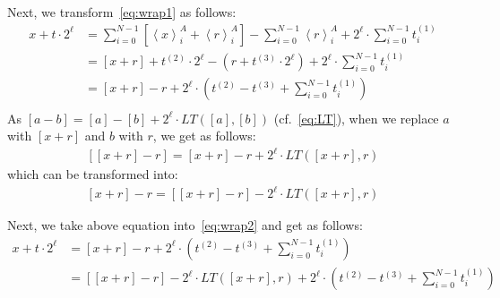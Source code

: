 Next, we transform~\autoref{eq:wrap1} as follows:
\begin{equation}
    \label{eq:wrap2}
    \begin{split}
        x + t\cdot 2^{\ell}  &= \sum_{i = 0}^{N-1}   \left[\left\langle x\right\rangle_i^A+ \left\langle r\right\rangle^A_i \right]  -\sum_{i = 0}^{N-1}\left\langle r\right\rangle^A_i+ 2^{\ell}\cdot \sum_{i = 0}^{N-1}t^{(1)}_i\\
        &= \left[x+r\right]     + t^{(2)}\cdot 2^{\ell}  -\left(r+   t^{(3)}  \cdot 2^{\ell} \right) + 2^{\ell}\cdot \sum_{i = 0}^{N-1}t^{(1)}_i\\
        &= \left[x+r\right]    -r +2^{\ell}\cdot \left(t^{(2)}  -  t^{(3)} +\sum_{i=0}^{N-1} t^{(1)}_i\right) \\
    \end{split}
\end{equation}
As $ \left[ a -b\right]   =\left[a\right]  -\left[ b\right]  +2^{\ell} \cdot LT\left(\left[a\right] ,\left[b\right] \right)$ (cf.~\autoref{eq:LT}), when we replace $a$ with $ \left[x+r  \right] $ and $b$ with $r$, we get as follows:
\begin{equation}
    \begin{split}
        \left[ \left[x+r\right]    -r  \right]  = \left[x+r  \right]  - r+2^{\ell} \cdot LT\left( \left[x+r \right] ,r\right)
    \end{split}
\end{equation}
which can be transformed into:
\begin{equation}
    \begin{split}
        \left[x+r\right]   - r=     \left[ \left[x+r\right]   -r \right]     -2^{\ell} \cdot LT\left( \left[x+r  \right] ,r\right)
    \end{split}
\end{equation}

Next, we take above equation into~\autoref{eq:wrap2} and get as follows:
\begin{equation}
    \label{eq:wrap3}
    \begin{split}
        x + t\cdot 2^{\ell}  &=\left[x+r\right]  -r +2^{\ell}\cdot \left(t^{(2)}  - t^{\left(3\right) }+\sum_{i=0}^{N-1} t^{(1)}_i\right) \\
        &=  \left[ \left[x+r\right]   -r \right]     -2^{\ell} \cdot LT\left( \left[x+r  \right] ,r\right)+2^{\ell}\cdot \left(t^{(2)}  -  t^{\left(3\right) } +\sum_{i=0}^{N-1} t^{(1)}_i\right)
    \end{split}
\end{equation}

